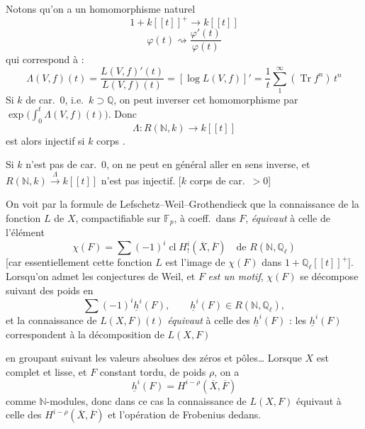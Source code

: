 \documentclass[11pt,a4paper]{article}
\begin{document}
Notons qu'on a un homomorphisme naturel \struck{\ill{}}
\[
  1 + k[[t]]^{+} \longrightarrow k[[t]]
\]
\[
  \varphi(t) \rightsquigarrow \frac{\varphi'(t)}{\varphi(t)}
\]
qui correspond à :
\[
  \Lambda(V, f)(t) = \frac{L(V, f)'(t)}{L(V, f)(t)} = [\log L(V, f)]' = \frac{1}{t} \sum_{1}^{\infty} (\operatorname{Tr} f^{n})\, t^{n}
\]
 Si $k$ de car.\ $0$, i.e.\ $k \supset
\mathbb{Q}$, on peut inverser cet homomorphisme par
$\exp\bigl(\int_{0}^{t} \Lambda(V, f)(t)\bigr)$. Donc
\[
  \Lambda : R(\mathbb{N}, k) \longrightarrow k[[t]]
\]
est alors injectif si $k$ corps .

Si $k$ n'est pas de car.\ $0$, on ne peut en général aller en sens inverse,
et $R(\mathbb{N}, k) \xrightarrow{\ \Lambda\ } k[[t]]$ n'est  pas injectif. [$k$ corps de car.\ $> 0$]

On voit  par la formule de Lefschetz--Weil--Grothendieck que la
connaissance de la fonction $L$ de $X$, compactifiable sur $\mathbb{F}_{p}$,
à coeff.\ dans $F$, \emph{équivaut} à celle de l'élément
\[
  \chi(F) = \sum (-1)^{i} \operatorname{cl} H^{i}_{!}(\overline{X}, \overline{F}) \quad \text{de } R(\mathbb{N}, \mathbb{Q}_{\ell})
\]
[car essentiellement cette fonction $L$ est l'image de $\chi(F)$ dans $1 +
\mathbb{Q}_{\ell}[[t]]^{+}$]. Lorsqu'on admet les conjectures de Weil, et $F$
\emph{est un motif}, $\chi(F)$ se décompose suivant des poids
en
\[
  \sum (-1)^{i} \underline{h}^{i}(F) , \qquad \underline{h}^{i}(F) \in R(\mathbb{N}, \mathbb{Q}_{\ell}) ,
\]
et la  connaissance de $L(X, F)(t)$ \emph{équivaut} à
celle des $\underline{h}^{i}(F)$ : les $\underline{h}^{i}(F)$ correspondent à
la décomposition de $L(X, F)$

 en groupant suivant les valeurs absolues des zéros et
pôles… Lorsque $X$ est complet et lisse, et $F$ constant tordu, de
poids $\rho$, on a
\[
  \underline{h}^{i}(F) = H^{i-\rho}(\overline{X}, \overline{F})
\]
comme $\mathbb{N}$-modules, donc dans ce cas la connaissance de $L(X, F)$ équivaut à
celle des $H^{i-\rho}(\overline{X}, \overline{F})$ et l'opération de Frobenius
dedans.

\end{document}

